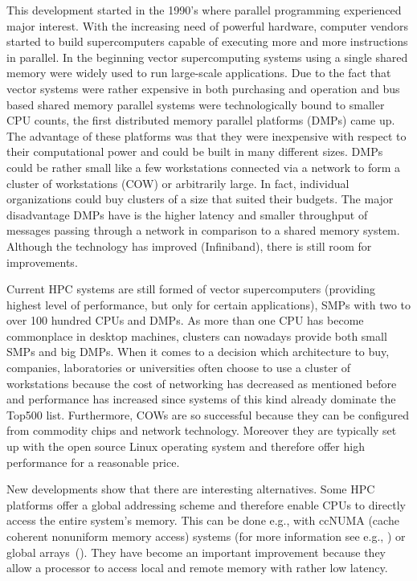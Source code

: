 This development started in the 1990's where parallel programming 
experienced major interest. With the increasing need of powerful
hardware, computer vendors started to build supercomputers capable of
executing more and more instructions in parallel. In the beginning
vector supercomputing systems using a single shared memory were widely
used to run large-scale applications. Due to the fact that vector
systems were rather expensive in both purchasing and operation and
bus based shared memory parallel systems were technologically bound
to smaller CPU counts, the first distributed memory parallel platforms (DMPs)
came up. The advantage of these platforms was that they were
inexpensive with respect to their computational power and could be 
built in many different sizes. DMPs could be rather small like a
few workstations connected via a network to form a cluster of
workstations (COW) or arbitrarily large. In fact, individual
organizations could buy clusters of a size that suited their
budgets. The major disadvantage DMPs have is the higher latency and
smaller throughput of messages passing through a network in comparison
to a shared memory system. Although the technology has improved
(Infiniband), there is still room for improvements. 

Current HPC systems are still formed of vector supercomputers
(providing highest level of performance, but only for certain
applications), SMPs with two to over 100 hundred CPUs and DMPs. As
more than one CPU has become commonplace in desktop machines, clusters
can nowadays provide both small SMPs and big DMPs. When it comes to a
decision which architecture to buy, companies, laboratories or
universities often choose to use a cluster of workstations because the
cost of networking has decreased as mentioned before and performance
has increased since systems of this kind already dominate the Top500
list. Furthermore, COWs are so successful because they can be
configured from commodity chips and network technology. Moreover they
are typically set up with the open source
Linux operating system and therefore offer high performance for a
reasonable price.

New developments show that there are interesting alternatives. Some
HPC platforms offer a global addressing scheme and therefore enable
CPUs to directly access the entire system's memory. This can be done
e.g., with ccNUMA (cache coherent nonuniform memory access) systems
(for more information see e.g., \cite{kleen05NUMA}) or
global arrays~(\cite{nieplocha96gan}).
They have become an important improvement because they allow a
processor to access local and remote memory with rather low latency.

